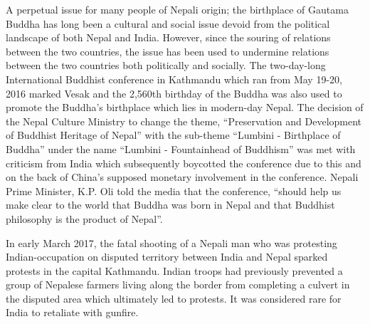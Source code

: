 \documentclass[
  openany]{book}
\begin{document}
A perpetual issue for many people of Nepali origin; the birthplace of Gautama Buddha has long been a cultural and social issue devoid from the political landscape of both Nepal and India. However, since the souring of relations between the two countries, the issue has been used to undermine relations between the two countries both politically and socially. The two-day-long International Buddhist conference in Kathmandu which ran from May 19-20, 2016 marked Vesak and the 2,560th birthday of the Buddha was also used to promote the Buddha's birthplace which lies in modern-day Nepal. The decision of the Nepal Culture Ministry to change the theme, ``Preservation and Development of Buddhist Heritage of Nepal'' with the sub-theme ``Lumbini - Birthplace of Buddha'' under the name ``Lumbini - Fountainhead of Buddhism'' was met with criticism from India which subsequently boycotted the conference due to this and on the back of China's supposed monetary involvement in the conference. Nepali Prime Minister, K.P. Oli told the media that the conference, ``should help us make clear to the world that Buddha was born in Nepal and that Buddhist philosophy is the product of Nepal''.

In early March 2017, the fatal shooting of a Nepali man who was protesting Indian-occupation on disputed territory between India and Nepal sparked protests in the capital Kathmandu. Indian troops had previously prevented a group of Nepalese farmers living along the border from completing a culvert in the disputed area which ultimately led to protests. It was considered rare for India to retaliate with gunfire.
\end{document}
